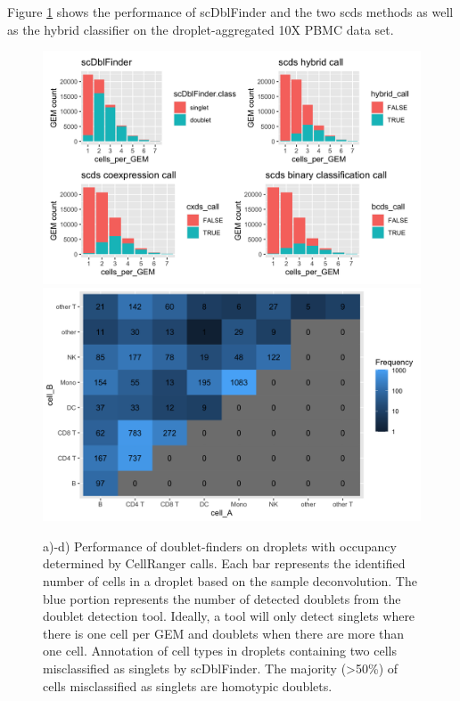 \documentclass[unnumsec,webpdf,modern,large]{oup-authoring-template}
\begin{document}
	Figure \ref{fig:doublet_finder_comparison} shows the performance of scDblFinder and the two scds methods as well as the hybrid classifier on the droplet-aggregated 10X PBMC data set.	 
	\begin{figure}
		\begin{center}
			\includegraphics[scale=0.1]{figures/doublet_finder_comparison.png} \\
			\includegraphics[scale=0.1]{figures/doublet_cell_types.png}
			
			\caption{ a)-d) Performance of doublet-finders on droplets with occupancy determined by CellRanger calls. 
				Each bar represents the identified number of cells in a droplet based on the sample deconvolution. 
				The blue portion represents the number of detected doublets from the doublet detection tool.
				Ideally, a tool will only detect singlets where there is one cell per GEM and doublets when there are more than one cell. 
				Annotation of cell types in droplets containing two cells misclassified as singlets by scDblFinder. The majority (>50\%) of cells misclassified as singlets are homotypic doublets.
			}
			\label{fig:doublet_finder_comparison}
		\end{center}
	\end{figure}
\end{document}
